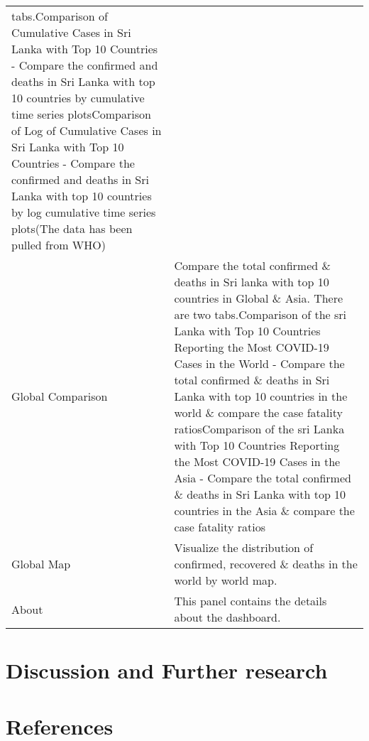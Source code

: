 \documentclass[
]{article}
\begin{document}
\begin{longtable}[]{@{}
  >{\raggedright\arraybackslash}p{}
  >{\raggedright\arraybackslash}p{}@{}}
tabs.\hfill\break * Comparison of Cumulative Cases in Sri Lanka with Top
10 Countries - Compare the confirmed and deaths in Sri Lanka with top 10
countries by cumulative time series plots\hfill\break * Comparison of
Log of Cumulative Cases in Sri Lanka with Top 10 Countries - Compare the
confirmed and deaths in Sri Lanka with top 10 countries by log
cumulative time series plots\hfill\break (The data has been pulled from
WHO)\hfill\break \\
Global Comparison & Compare the total confirmed \& deaths in Sri lanka
with top 10 countries in Global \& Asia. There are two
tabs.\hfill\break * Comparison of the sri Lanka with Top 10 Countries
Reporting the Most COVID-19 Cases in the World - Compare the total
confirmed \& deaths in Sri Lanka with top 10 countries in the world \&
compare the case fatality ratios\hfill\break * Comparison of the sri
Lanka with Top 10 Countries Reporting the Most COVID-19 Cases in the
Asia - Compare the total confirmed \& deaths in Sri Lanka with top 10
countries in the Asia \& compare the case fatality ratios\hfill\break \\
Global Map & Visualize the distribution of confirmed, recovered \&
deaths in the world by world map.\hfill\break \\
About & This panel contains the details about the dashboard. \\
\bottomrule
\end{longtable}

\hypertarget{discussion-and-further-research}{%
\section{Discussion and Further
research}\label{discussion-and-further-research}}

\hypertarget{references}{%
\section*{References}\label{references}}
\end{document}
